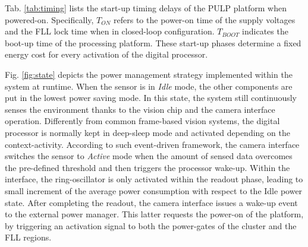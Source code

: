\documentclass[journal]{IEEEtran}
\begin{document}
Tab. \ref{tab:timing} lists the start-up timing delays of the PULP platform when powered-on. Specifically, $T_{ON}$ refers to the power-on time of the supply voltages and the FLL lock time when in closed-loop configuration. $T_{BOOT}$ indicates the boot-up time of the processing platform. 
These start-up phases determine a fixed energy cost for every activation of the digital processor.

\begin{table}[]
\caption{System Delay Timing Parameters}	\label{tab:timing}

\centering
{}
\end{table}


Fig. \ref{fig:state} depicts the power management strategy implemented within the system at runtime.
When the sensor is in \textit{Idle} mode, 
the other components are put in the lowest power saving mode. In this state, the system still continuously senses the environment thanks to the vision chip and the camera interface operation. Differently from common frame-based vision systems, the digital processor is normally kept in deep-sleep mode and activated depending on the context-activity. According to such event-driven framework, the camera interface switches the sensor to \textit{Active} mode when the amount of sensed data overcomes the pre-defined threshold and then triggers the processor wake-up. Within the interface, the ring-oscillator is only activated within the readout phase, leading to small increment of the average power consumption with respect to the Idle power state. 
After completing the readout, the camera interface issues a wake-up event to the external power manager. This latter requests the power-on of the platform, by triggering an activation signal to both the power-gates of the cluster and the FLL regions.
\end{document}
